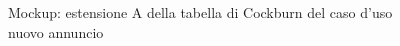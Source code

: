 \begin{figure}[ht]
    \caption{Mockup: estensione A della tabella di Cockburn del caso d'uso nuovo annuncio}
    \label{fig:mockup_estensione_A_aggiungi_annuncio}
\end{figure}

\newpage

